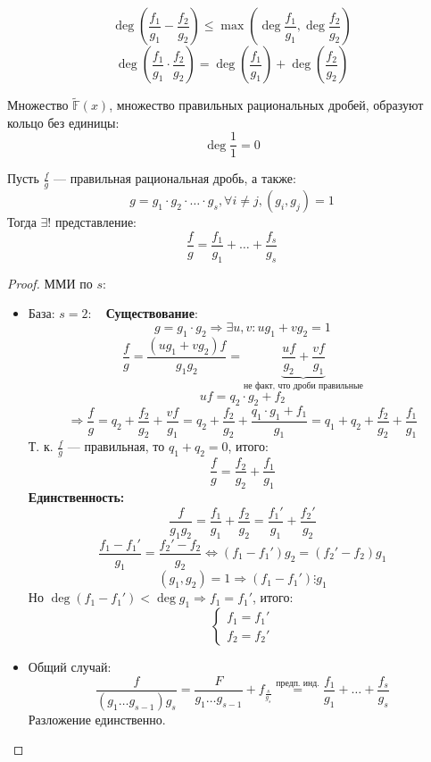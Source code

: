\begin{task}
  \[
  \deg \left(\frac{f_1}{g_1} - \frac{f_2}{g_2}\right) \leq \max\left(\deg \frac{f_1}{g_1}, \deg \frac{f_2}{g_2}\right)
  \]
  \[
  \deg \left(\frac{f_1}{g_1} \cdot \frac{f_2}{g_2}\right) = \deg \left(\frac{f_1}{g_1}\right) + \deg \left(\frac{f_2}{g_2}\right)
  \]
\end{task}
\begin{statement}
  \label{statement:03_2}
  Множество $\tilde{\mathbb{F}}(x)$, множество правильных рациональных дробей, образуют кольцо без единицы:
  \[
  \deg \frac{1}{1} = 0
  \]
\end{statement}
\begin{theorem}
\label{theorem:03_1}
  Пусть $\frac{f}{g}$ --- правильная рациональная дробь, а также:
  \[
  g = g_1 \cdot g_2 \cdot \ldots \cdot g_s, \forall i \neq j, (g_i, g_j) = 1
  \]
  Тогда $\exists!$ представление:
  \[
  \frac{f}{g} = \frac{f_1}{g_1} + \ldots + \frac{f_s}{g_s}
  \]
\end{theorem}
\begin{proof}
  ММИ по $s$:
  \begin{itemize}
    \item База: $s = 2$:
      ~\newline
      \textbf{Существование}:
      \[
      g = g_1 \cdot g_2 \Rightarrow \exists u, v \colon ug_1 + vg_2 = 1
      \]
      \[
      \frac{f}{g} = \frac{(ug_1 + vg_2)f}{g_1 g_2} = \underbrace{\frac{uf}{g_2} + \frac{vf}{g_1}}_{\text{не факт, что дроби правильные}}
      \]
      \[
    uf = q_2 \cdot g_2 + f_2 
      \]
      \[
      \Rightarrow \frac{f}{g} = q_2 + \frac{f_2}{g_2} + \frac{vf}{g_1} = q_2 + \frac{f_2}{g_2} + \frac{q_1 \cdot g_1 + f_1}{g_1} = q_1 + q_2 + \frac{f_2}{g_2} + \frac{f_1}{g_1}
      \]
      Т. к. $\frac{f}{g}$ --- правильная, то $q_1 + q_2 = 0$, итого:
      \[
      \frac{f}{g} = \frac{f_2}{g_2} + \frac{f_1}{g_1}
      \]
      \textbf{Единственность:}
      \[
      \frac{f}{g_1g_2} = \frac{f_1}{g_1} + \frac{f_2}{g_2} = \frac{f_1'}{g_1} + \frac{f_2'}{g_2}
      \]
      \[
        \frac{f_1 - f_1'}{g_1} = \frac{f_2' - f_2}{g_2} \iff (f_1 - f_1')g_2 = (f_2' - f_2)g_1
      \]
      \[
        (g_1, g_2) = 1 \Rightarrow (f_1 - f_1') \vdots g_1
      \]
      Но $\deg (f_1 - f_1') < \deg g_1 \Rightarrow f_1 = f_1'$, итого:
      \[
      \begin{cases}
      f_1 = f_1' \\
      f_2 = f_2'
      \end{cases}
      \]
    \item Общий случай:
      \[
      \frac{f}{(g_1 \ldots g_{s - 1}) g_s} = \frac{F}{g_1 \ldots g_{s - 1}} + f_\frac{s}{g_s} \overset{\text{предп. инд.}}{=} \frac{f_1}{g_1} + \ldots + \frac{f_s}{g_s}
      \]
      Разложение единственно.
  \end{itemize}
\end{proof}
